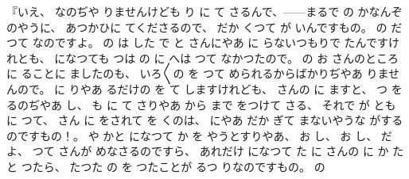 『いえ、
%
なのぢや
りませんけども
り
に
て
さるんで、{---}{---}まるで
の
かなんぞのやうに、
%
あつかひに
てくださるので、
%
だか
くつて
が
いんですもの。
%
の
だつて
なのですよ。
%
の
は
した
で
と
さんにやあ
に
らないつもりで
たんですけれとも、
%
になつても
つは
の
に
へは
つて
なかつたので。
%
の
お
さんのところに
ることに
ましたのも、
%
いろ〳〵の
を
つて
められるからばかりぢやあ
りませんので。
%
に
りやあ
るだけの
を
て
しますけれども、
%
さんの
に
ますと、
%
つ
を
るのぢやあ
し、
%
も
に
て
さりやあ
から
まで
をつけて
さる、
%
それで
が
とも
に
つて、
%
さん
に
をされて
を
くのは、
%
にやあ
だか
ぎて
まないやうな
がするのですもの！。
%
や
かと
になつて
か
を
やうとすりやあ、
%
お
し、
%
お
し、
%
だよ、
%
つて
さんが
めなさるのですら、
%
あれだけ
になつて
た
に
さんの
に
か
たと
つたら、
%
たつた
の
を
つたことが
るつ
りなのですもの。
%
の
